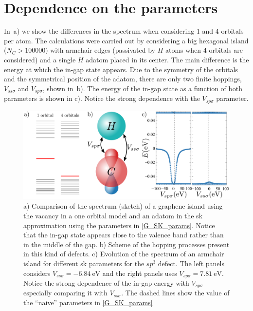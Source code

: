 

\section{Dependence on the parameters}
In~a) we show the differences in the spectrum when considering 1 and 4 orbitals per atom. The calculations were carried out by considering a big hexagonal island ($N_C>100000$) with armchair edges (passivated by $H$ atoms when 4 orbitals are considered) and a single $H$ adatom placed in its center.
The main difference is the energy at which the in-gap state appears.
Due to the symmetry of the orbitals and the symmetrical position of the adatom, there are only two finite hoppings, $V_{ss\sigma}$ and $V_{sp\sigma}$, shown in~b).
The energy of the in-gap state as a function of both parameters is shown in c). Notice the strong dependence with the $V_{sp\sigma}$ parameter.

\begin{figure}[h!]
  \centering
  \includegraphics{defects/fig/Vsss_Vsps.pdf}
  \vspace{-5pt}
  \caption{a) Comparison of the spectrum (sketch) of a graphene island using the vacancy in a one orbital model and an adatom in the \ac{sk} approximation using the parameters in \ref{G_SK_params}. Notice that the in-gap state appears close to the valence band rather than in the middle of the gap. b) Scheme of the hopping processes present in this kind of defects. c) Evolution of the spectrum of an armchair island for different \ac{sk} parameters for the $sp^3$ defect. The left panels considers $V_{ss\sigma}=\SI{-6.84}{\eV}$ and the right panels uses $V_{sp\sigma}=\SI{7.81}{\eV}$. Notice the strong dependence of the in-gap energy with $V_{sp\sigma}$ especially comparing it with $V_{ss\sigma}$. The dashed lines show the value of the ``naive'' parameters in \ref{G_SK_params}}
\label{ingap}
\end{figure}

